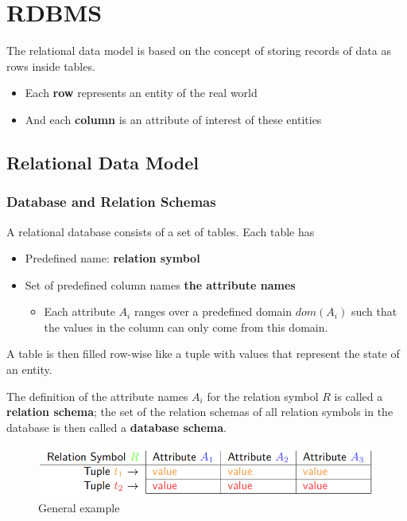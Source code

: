 \chapter{RDBMS}
The relational data model is based on the concept of storing records of data as rows inside tables.
\begin{itemize}
    \item Each \textbf{row} represents an entity of the real world
    \item And each \textbf{column} is an attribute of interest of these entities
\end{itemize}

\section{Relational Data Model}
\subsection{Database and Relation Schemas}
A relational database consists of a set of tables. Each table has
\begin{itemize}
    \item Predefined name: \textbf{relation symbol}
    \item Set of predefined column names \textbf{the attribute names}
    \begin{itemize}
        \item  Each attribute \(A_i\) ranges over a predefined domain \(dom(A_i)\) such that the values in the column can only come from this domain.
    \end{itemize}
\end{itemize}
A table is then filled row-wise like a tuple with values that represent the state of an entity.

The definition of the attribute names \(A_i\) for the relation symbol \(R\) is called a \textbf{relation schema}; the set of the relation schemas of all relation symbols in the database is then called a \textbf{database schema}.

\begin{figure}[!hbp]
    \centering
    \includegraphics[width=0.90\linewidth]{images/AdvancedDataManagment/rdbms/relational_database_1.png}
    \caption{General example}
\end{figure}
\newpage

